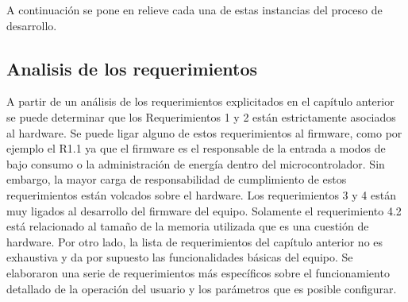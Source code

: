 A continuación se pone en relieve cada una de estas instancias del proceso de desarrollo.

\subsection{Analisis de los requerimientos}

A partir de un análisis de los requerimientos explicitados en el capítulo anterior se puede determinar que los Requerimientos 1 y 2 están estrictamente asociados al hardware. Se puede ligar alguno de estos requerimientos al firmware, como por ejemplo el R1.1 ya que el firmware es el responsable de la entrada a modos de bajo consumo o la administración de energía dentro del microcontrolador. Sin embargo, la mayor carga de responsabilidad de cumplimiento de estos requerimientos están volcados sobre el hardware. Los requerimientos 3 y 4 están muy ligados al desarrollo del firmware del equipo. Solamente el requerimiento 4.2 está relacionado al tamaño de la memoria utilizada que es una cuestión de hardware.
Por otro lado, la lista de requerimientos del capítulo anterior no es exhaustiva y da por supuesto las funcionalidades básicas del equipo. Se elaboraron una serie de requerimientos más específicos sobre el funcionamiento detallado de la operación del usuario y los parámetros que es posible configurar. 


